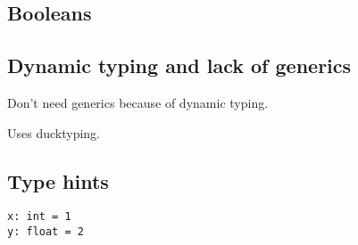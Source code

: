 \subsection{Booleans}

\subsection{Dynamic typing and lack of generics}

Don't need generics because of dynamic typing.

Uses ducktyping.

\subsection{Type hints}

\begin{verbatim}
x: int = 1
y: float = 2
\end{verbatim}

